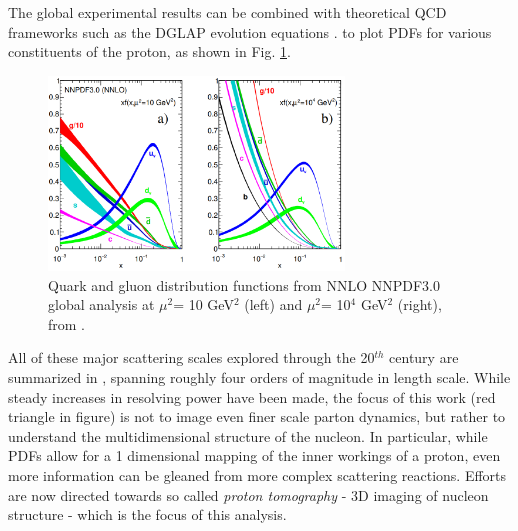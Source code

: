         The global experimental results can be combined with theoretical QCD frameworks such as the DGLAP evolution equations \parencite{Altarelli1977AsymptoticLanguage}. to plot PDFs for various constituents of the proton, as shown in Fig. \ref{fig:PDFPlots}. 
        
                \begin{figure}[H]
            \centering
            \includegraphics[width=0.7\textwidth]{Chapters/Ch1-Intro/Ch1-Sec1-Background/pics/inelastic-ep/partonPDFs.png}
            \caption[Parton Distribution Functions]{Quark and gluon distribution functions from NNLO NNPDF3.0 global analysis at $\mu^2$= 10 GeV$^2$ (left) and $\mu^2$= 10$^4$ GeV$^2$ (right),  from \parencite{Zyla2020ReviewPhysics}.}
            \label{fig:PDFPlots}
        \end{figure}

       All of these major scattering scales explored through the 20$^{th}$ century are summarized in , spanning roughly four orders of magnitude in length scale. While steady increases in resolving power have been made, the focus of this work (red triangle in figure) is not to image even finer scale parton dynamics, but rather to understand the multidimensional structure of the nucleon. In particular, while PDFs allow for a 1 dimensional mapping of the inner workings of a proton, even more information can be gleaned from more complex scattering reactions. Efforts are now directed towards so called \textit{proton tomography} - 3D imaging of nucleon structure - which is the focus of this analysis. 

